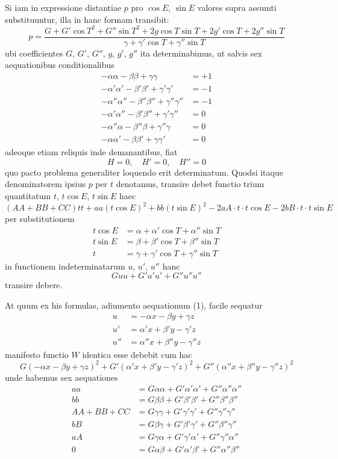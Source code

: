 \documentclass[12pt,a4paper]{article}
\begin{document}
Si iam in expressione distantiae $p$ pro $\cos E$, $\sin E$ valores supra assumti substituuntur, illa in hanc formam transibit:
\[
p = \frac{G + G'\cos T^2 + G''\sin T^2
+ 2g\cos T\sin T + 2g'\cos T + 2g''\sin T}
{\gamma + \gamma'\cos T + \gamma''\sin T}
\]
ubi coefficientes $G$, $G'$, $G''$, $g$, $g'$, $g''$ ita determinabimus, ut salvis sex aequationibus conditionalibus
\[
\begin{aligned}
-\alpha\alpha - \beta\beta + \gamma\gamma &= +1 \\
-\alpha'\alpha' - \beta'\beta' + \gamma'\gamma' &= -1 \\
-\alpha''\alpha'' - \beta''\beta'' + \gamma''\gamma'' &= -1 \\
-\alpha'\alpha'' - \beta'\beta'' + \gamma'\gamma'' &= 0 \\
-\alpha''\alpha - \beta''\beta + \gamma''\gamma &= 0 \\
-\alpha\alpha' - \beta\beta' + \gamma\gamma' &= 0
\end{aligned}
\tag{1}
\]
adeoque etiam reliquis inde demanantibus, fiat
\[
H = 0, \quad H' = 0, \quad H'' = 0
\]
quo pacto problema generaliter loquendo erit determinatum. Quodsi itaque denominatorem ipsius $p$ per $t$ denotamus, transire debet functio trium quantitatum $t$, $t\cos E$, $t\sin E$ haec
\[
(AA+BB+CC)tt + aa(t\cos E)^2 + bb(t\sin E)^2
- 2aA \cdot t \cdot t\cos E - 2bB \cdot t \cdot t\sin E
\]
per substitutionem
\[
\begin{aligned}
t\cos E &= \alpha + \alpha'\cos T + \alpha''\sin T \\
t\sin E &= \beta + \beta'\cos T + \beta''\sin T \\
t &= \gamma + \gamma'\cos T + \gamma''\sin T
\end{aligned}
\]
in functionem indeterminatarum $u$, $u'$, $u''$ hanc
\[
Guu + G'u'u' + G''u''u''
\]
transire debere.

At quum ex his formulas, adiumento aequationum (1), facile sequatur
\[
\begin{aligned}
u &= -\alpha x - \beta y + \gamma z \\
u' &= \alpha' x + \beta' y - \gamma' z \\
u'' &= \alpha'' x + \beta'' y - \gamma'' z
\end{aligned}
\]
manifesto functio $W$ identica esse debebit cum hac
\[
G(-\alpha x - \beta y + \gamma z)^2
+ G'(\alpha' x + \beta' y - \gamma' z)^2
+ G''(\alpha'' x + \beta'' y - \gamma'' z)^2
\]
unde habemus sex aequationes
\[
\begin{aligned}
aa &= G\alpha\alpha + G'\alpha'\alpha' + G''\alpha''\alpha'' \\
bb &= G\beta\beta + G'\beta'\beta' + G''\beta''\beta'' \\
AA+BB+CC &= G\gamma\gamma + G'\gamma'\gamma' + G''\gamma''\gamma'' \\
bB &= G\beta\gamma + G'\beta'\gamma' + G''\beta''\gamma'' \\
aA &= G\gamma\alpha + G'\gamma'\alpha' + G''\gamma''\alpha'' \\
0 &= G\alpha\beta + G'\alpha'\beta' + G''\alpha''\beta''
\end{aligned}
\tag{2}
\]
\end{document}
